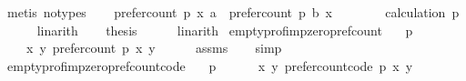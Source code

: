 \begin{isabellebody}
\ {\isacharparenleft}{\kern0pt}metis\ {\isacharparenleft}{\kern0pt}no{\isacharunderscore}{\kern0pt}types{\isacharparenright}{\kern0pt}{\isacharparenright}{\kern0pt}\isanewline
\ \ \isamarkupfalse%
\ {\isachardoublequoteopen}{\isacharparenleft}{\kern0pt}prefer{\isacharunderscore}{\kern0pt}count\ p\ x\ a{\isacharparenright}{\kern0pt}\ {\isasymle}\ {\isacharparenleft}{\kern0pt}prefer{\isacharunderscore}{\kern0pt}count\ p\ b\ x{\isacharparenright}{\kern0pt}{\isachardoublequoteclose}\isanewline
\ \ \ \ \isamarkupfalse%
\ {\isachardoublequoteopen}{}{\isachardoublequoteclose}\ {\isachardoublequoteopen}{}{\isachardoublequoteclose}\ calculation\ p{}\isanewline
\ \ \ \ \isamarkupfalse%
\ linarith\isanewline
\ \ \isamarkupfalse%
\ {\isacharquery}{\kern0pt}thesis\isanewline
\ \ \ \ \isamarkupfalse%
\ linarith\isanewline
{}\isamarkupfalse%
%
\endisatagproof
{\isafoldproof}%
%
\isadelimproof
\isanewline
%
\endisadelimproof
\isanewline
{}\isamarkupfalse%
\ empty{\isacharunderscore}{\kern0pt}prof{\isacharunderscore}{\kern0pt}imp{\isacharunderscore}{\kern0pt}zero{\isacharunderscore}{\kern0pt}pref{\isacharunderscore}{\kern0pt}count{\isacharcolon}{\kern0pt}\isanewline
\ \ \ {\isachardoublequoteopen}p\ {\isacharequal}{\kern0pt}\ {\isacharbrackleft}{\kern0pt}{\isacharbrackright}{\kern0pt}{\isachardoublequoteclose}\isanewline
\ \ \ {\isachardoublequoteopen}{\isasymforall}\ x\ y{\isachardot}{\kern0pt}\ prefer{\isacharunderscore}{\kern0pt}count\ p\ x\ y\ {\isacharequal}{\kern0pt}\ {}{\isachardoublequoteclose}\isanewline
%
\isadelimproof
\ \ %
\endisadelimproof
%
\isatagproof
{}\isamarkupfalse%
\ assms\isanewline
\ \ \isamarkupfalse%
\ simp%
\endisatagproof
{\isafoldproof}%
%
\isadelimproof
\isanewline
%
\endisadelimproof
\isanewline
{}\isamarkupfalse%
\ empty{\isacharunderscore}{\kern0pt}prof{\isacharunderscore}{\kern0pt}imp{\isacharunderscore}{\kern0pt}zero{\isacharunderscore}{\kern0pt}pref{\isacharunderscore}{\kern0pt}count{\isacharunderscore}{\kern0pt}code{\isacharcolon}{\kern0pt}\isanewline
\ \ \ {\isachardoublequoteopen}p\ {\isacharequal}{\kern0pt}\ {\isacharbrackleft}{\kern0pt}{\isacharbrackright}{\kern0pt}{\isachardoublequoteclose}\isanewline
\ \ \ {\isachardoublequoteopen}{\isasymforall}\ x\ y{\isachardot}{\kern0pt}\ prefer{\isacharunderscore}{\kern0pt}count{\isacharunderscore}{\kern0pt}code\ p\ x\ y\ {\isacharequal}{\kern0pt}\ {}{\isachardoublequoteclose}\isanewline

\end{isabellebody}

